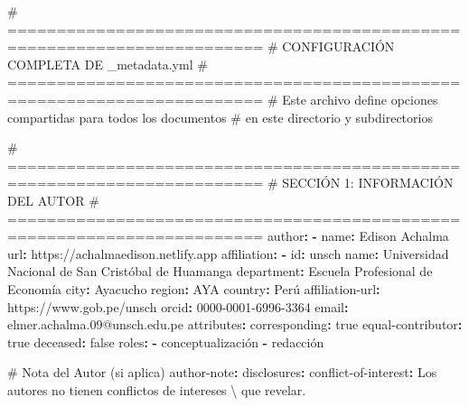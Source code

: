 \documentclass[
  doc,
  floatsintext,
  longtable,
  a4paper,
  nolmodern,
  notxfonts,
  notimes,
  12pt,
  colorlinks=true,linkcolor=blue,citecolor=blue,urlcolor=blue]{apa7}
\newenvironment{Shaded}{\begin{snugshade}}{\end{snugshade}}
\newcommand{\AttributeTok}[1]{\textcolor[rgb]{0.40,0.45,0.13}{#1}}
\newcommand{\CharTok}[1]{\textcolor[rgb]{0.13,0.47,0.30}{#1}}
\newcommand{\CommentTok}[1]{\textcolor[rgb]{0.37,0.37,0.37}{#1}}
\newcommand{\FunctionTok}[1]{\textcolor[rgb]{0.28,0.35,0.67}{#1}}
\newcommand{\KeywordTok}[1]{\textcolor[rgb]{0.00,0.23,0.31}{\textbf{#1}}}
\begin{document}
\begin{Shaded}
\begin{Highlighting}[]
\CommentTok{\# ========================================================================}
\CommentTok{\# CONFIGURACIÓN COMPLETA DE \_metadata.yml}
\CommentTok{\# ========================================================================}
\CommentTok{\# Este archivo define opciones compartidas para todos los documentos}
\CommentTok{\# en este directorio y subdirectorios}

\CommentTok{\# ========================================================================}
\CommentTok{\# SECCIÓN 1: INFORMACIÓN DEL AUTOR}
\CommentTok{\# ========================================================================}
\FunctionTok{author}\KeywordTok{:}
\AttributeTok{  }\KeywordTok{{-}}\AttributeTok{ }\FunctionTok{name}\KeywordTok{:}\AttributeTok{ Edison Achalma}
\AttributeTok{    }\FunctionTok{url}\KeywordTok{:}\AttributeTok{ https://achalmaedison.netlify.app}
\AttributeTok{    }\FunctionTok{affiliation}\KeywordTok{:}
\AttributeTok{      }\KeywordTok{{-}}\AttributeTok{ }\FunctionTok{id}\KeywordTok{:}\AttributeTok{ unsch}
\AttributeTok{        }\FunctionTok{name}\KeywordTok{:}\AttributeTok{ Universidad Nacional de San Cristóbal de Huamanga}
\AttributeTok{        }\FunctionTok{department}\KeywordTok{:}\AttributeTok{ Escuela Profesional de Economía}
\AttributeTok{        }\FunctionTok{city}\KeywordTok{:}\AttributeTok{ Ayacucho}
\AttributeTok{        }\FunctionTok{region}\KeywordTok{:}\AttributeTok{ AYA}
\AttributeTok{        }\FunctionTok{country}\KeywordTok{:}\AttributeTok{ Perú}
\AttributeTok{    }\FunctionTok{affiliation{-}url}\KeywordTok{:}\AttributeTok{ https://www.gob.pe/unsch}
\AttributeTok{    }\FunctionTok{orcid}\KeywordTok{:}\AttributeTok{ 0000{-}0001{-}6996{-}3364}
\AttributeTok{    }\FunctionTok{email}\KeywordTok{:}\AttributeTok{ elmer.achalma.09@unsch.edu.pe}
\AttributeTok{    }\FunctionTok{attributes}\KeywordTok{:}
\AttributeTok{      }\FunctionTok{corresponding}\KeywordTok{:}\AttributeTok{ }\CharTok{true}
\AttributeTok{      }\FunctionTok{equal{-}contributor}\KeywordTok{:}\AttributeTok{ }\CharTok{true}
\AttributeTok{      }\FunctionTok{deceased}\KeywordTok{:}\AttributeTok{ }\CharTok{false}
\AttributeTok{    }\FunctionTok{roles}\KeywordTok{:}
\AttributeTok{      }\KeywordTok{{-}}\AttributeTok{ conceptualización}
\AttributeTok{      }\KeywordTok{{-}}\AttributeTok{ redacción}

\CommentTok{\# Nota del Autor (si aplica)}
\FunctionTok{author{-}note}\KeywordTok{:}
\AttributeTok{  }\FunctionTok{disclosures}\KeywordTok{:}
\AttributeTok{    }\FunctionTok{conflict{-}of{-}interest}\KeywordTok{:}\AttributeTok{ Los autores no tienen conflictos de intereses \textbackslash{} }
\AttributeTok{    que revelar.}


\end{Highlighting}
\end{Shaded}
\end{document}
